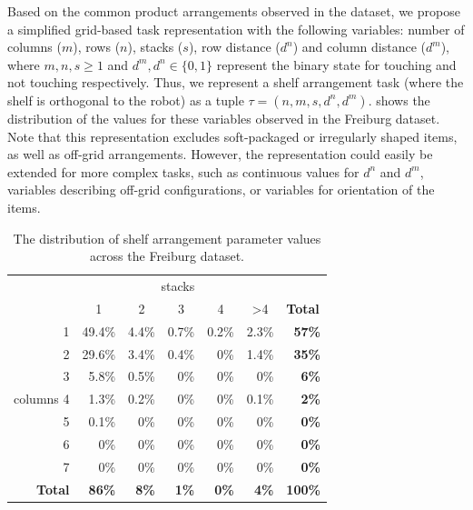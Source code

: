 Based on the common product arrangements observed in the dataset, we propose a simplified grid-based task representation with the following variables: number of columns ($m$), rows ($n$), stacks ($s$), row distance ($d^n$) and column distance ($d^m$), where $m, n, s \geq 1$ and $d^m, d^n \in \{0,1\}$ represent the binary state for touching and not touching respectively.
Thus, we represent a shelf arrangement task (where the shelf is orthogonal to the robot) as a tuple $\tau = (n, m, s,d^n,d^m)$. 
 shows the distribution of the values for these variables observed in the Freiburg dataset.
Note that this representation excludes soft-packaged or irregularly shaped items, as well as off-grid arrangements.
However, the representation could easily be extended for more complex tasks, such as continuous values for $d^n$ and $d^m$, variables describing off-grid configurations, or variables for orientation of the items.

\begin{table}[h]
	\centering
	\caption{The distribution of shelf arrangement parameter values across the Freiburg dataset.}
	\label{tab:data-analysis}
	\begin{tabular}{r|rrrrr|r}
		\multicolumn{1}{l}{} & \multicolumn{5}{c}{stacks} & \multicolumn{1}{l}{} \\
		 & \multicolumn{1}{c}{1} & \multicolumn{1}{c}{2} & \multicolumn{1}{c}{3} & \multicolumn{1}{c}{4} & \multicolumn{1}{c}{\textgreater4} &  \multicolumn{1}{l}{\textbf{Total}} \\ \hline
		1 & 49.4\% & 4.4\% & 0.7\% & 0.2\% & 2.3\% & \textbf{57\%} \\
		2 & 29.6\% & 3.4\% & 0.4\% & 0\% & 1.4\% & \textbf{35\%} \\
		3 & 5.8\% & 0.5\% & 0\% & 0\% & 0\% & \textbf{6\%} \\
	columns	4 & 1.3\% & 0.2\% & 0\% & 0\% & 0.1\% & \textbf{2\%} \\
		5 & 0.1\% & 0\% & 0\% & 0\% & 0\% & \textbf{0\%} \\
		6 & 0\% & 0\% & 0\% & 0\% & 0\% & \textbf{0\%} \\
		7 & 0\% & 0\% & 0\% & 0\% & 0\% & \textbf{0\%} \\ \hline
		\textbf{Total} & \textbf{86\%} & \textbf{8\%} & \textbf{1\%} & \textbf{0\%} & \textbf{4\%} & \textbf{100\%}
	\end{tabular}
\end{table}

